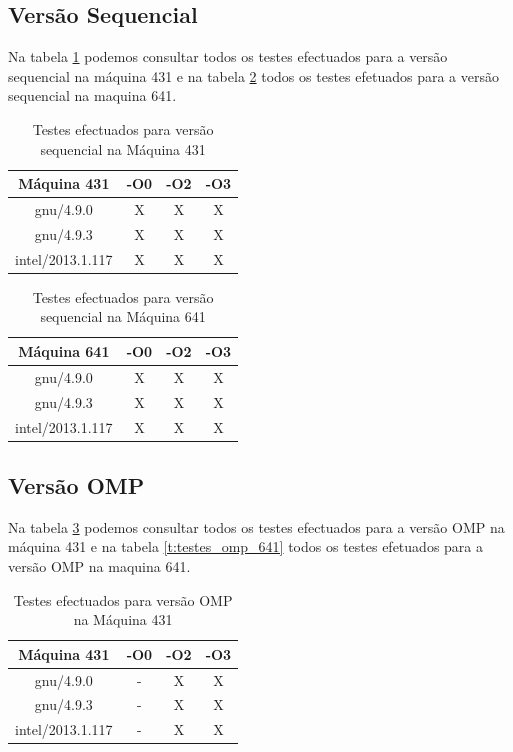 \documentclass[conference,compsoc]{IEEEtran}
\begin{document}
\subsection{Versão Sequencial}
Na tabela \ref{t:testes_seq_431} podemos consultar todos os testes efectuados para a versão sequencial na máquina 431 e na tabela \ref{t:testes_seq_641} todos os testes efetuados para a versão sequencial na maquina 641.
\begin{table}[h!]
\begin{center}
\begin{tabular}{|c|c|c|c|}
\hline
Máquina 431 & -O0 & -O2 & -O3 \\
\hline
gnu/4.9.0 & X & X & X \\
\hline
gnu/4.9.3 & X & X & X \\
\hline
intel/2013.1.117 & X & X & X \\
\hline
\end{tabular}
\end{center}
\caption{Testes efectuados para versão sequencial na Máquina 431}
\label{t:testes_seq_431}
\end{table}%

\begin{table}[h!]
\begin{center}
\begin{tabular}{|c|c|c|c|}
\hline
Máquina 641 & -O0 & -O2 & -O3 \\
\hline
gnu/4.9.0 & X & X & X \\
\hline
gnu/4.9.3 & X & X & X \\
\hline
intel/2013.1.117 & X & X & X \\
\hline
\end{tabular}
\end{center}
\caption{Testes efectuados para versão sequencial na Máquina 641}
\label{t:testes_seq_641}
\end{table}

\subsection{Versão OMP}
Na tabela \ref{t:testes_omp_431} podemos consultar todos os testes efectuados para a versão OMP na máquina 431 e na tabela \ref{t:testes_omp_641} todos os testes efetuados para a versão OMP na maquina 641.
\begin{table}[h!]
\begin{center}
\begin{tabular}{|c|c|c|c|}
\hline
Máquina 431 & -O0 & -O2 & -O3 \\
\hline
gnu/4.9.0 & - & X & X \\
\hline
gnu/4.9.3 & - & X & X \\
\hline
intel/2013.1.117 & - & X & X \\
\hline
\end{tabular}
\end{center}
\caption{Testes efectuados para versão OMP na Máquina 431}
\label{t:testes_omp_431}
\end{table}%
\end{document}
